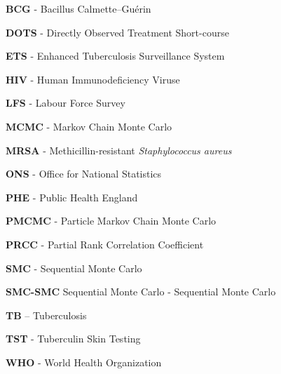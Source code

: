 \documentclass[11pt,twoside]{bristolthesis}
\begin{document}
      \listoffigures
      \begin{acronyms}
      \textbf{BCG} - Bacillus Calmette--Guérin
      
      \par
      
      \textbf{DOTS} - Directly Observed Treatment Short-course
      
      \par
      
      \textbf{ETS} - Enhanced Tuberculosis Surveillance System
      
      \par
      
      \textbf{HIV} - Human Immunodeficiency Viruse
      
      \par
      
      \textbf{LFS} - Labour Force Survey
      
      \par
      
      \textbf{MCMC} - Markov Chain Monte Carlo
      
      \par
      
      \textbf{MRSA} - Methicillin-resistant \emph{Staphylococcus aureus}
      
      \par
      
      \textbf{ONS} - Office for National Statistics
      
      \par
      
      \textbf{PHE} - Public Health England
      
      \par
      
      \textbf{PMCMC} - Particle Markov Chain Monte Carlo
      
      \par
      
      \textbf{PRCC} - Partial Rank Correlation Coefficient
      
      \par
      
      \textbf{SMC} - Sequential Monte Carlo
      
      \par
      
      \textbf{SMC-SMC} Sequential Monte Carlo - Sequential Monte Carlo
      
      \par
      
      \textbf{TB} -- Tuberculosis
      
      \par
      
      \textbf{TST} - Tuberculin Skin Testing
      
      \par
      
      \textbf{WHO} - World Health Organization
      
      \par
    \end{acronyms}
\end{document}
